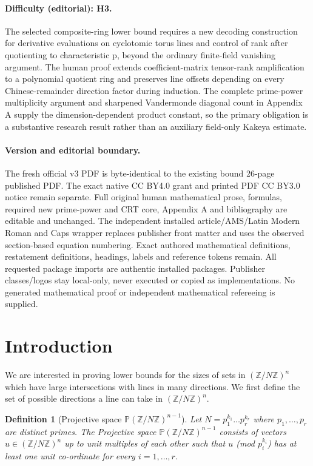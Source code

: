 \documentclass[11pt]{article}
\numberwithin{equation}{section}
\newtheorem{define}[thm]{Definition}
\def\Z{{\mathbb{Z}}}
\def\P{{\mathbb{P}}}
\begin{document}
\paragraph{Difficulty (editorial): H3.} The selected composite-ring lower bound requires a new decoding construction for derivative evaluations on cyclotomic torus lines and control of rank after quotienting to characteristic p, beyond the ordinary finite-field vanishing argument. The human proof extends coefficient-matrix tensor-rank amplification to a polynomial quotient ring and preserves line offsets depending on every Chinese-remainder direction factor during induction. The complete prime-power multiplicity argument and sharpened Vandermonde diagonal count in Appendix A supply the dimension-dependent product constant, so the primary obligation is a substantive research result rather than an auxiliary field-only Kakeya estimate.
\paragraph{Version and editorial boundary.} The fresh official v3 PDF is byte-identical to the existing bound 26-page published PDF. The exact native CC BY4.0 grant and printed PDF CC BY3.0 notice remain separate. Full original human mathematical prose, formulas, required new prime-power and CRT core, Appendix A and bibliography are editable and unchanged. The independent installed article/AMS/Latin Modern Roman and Caps wrapper replaces publisher front matter and uses the observed section-based equation numbering. Exact authored mathematical definitions, restatement definitions, headings, labels and reference tokens remain. All requested package imports are authentic installed packages. Publisher classes/logos stay local-only, never executed or copied as implementations. No generated mathematical proof or independent mathematical refereeing is supplied.
\clearpage
\section{Introduction}
We are interested in proving lower bounds for the sizes of sets in $(\Z/N\Z)^n$ which have large intersections with lines in many directions. We first define the set of possible directions a line can take in $(\Z/N\Z)^n$.

\begin{define}[Projective space $\P (\Z/N\Z)^{n-1}$]
Let $N=p_1^{k_1}\hdots p_r^{k_r}$ where $p_1,\hdots,p_r$ are distinct primes. The Projective space $\P (\Z/N\Z)^{n-1}$ consists of vectors $u\in (\Z/N\Z)^n$ up to unit multiples of each other such that {\em $u$ (mod $p_i^{k_i}$)} has at least one unit co-ordinate for every $i=1,\hdots,r$.
\end{define}
\end{document}

